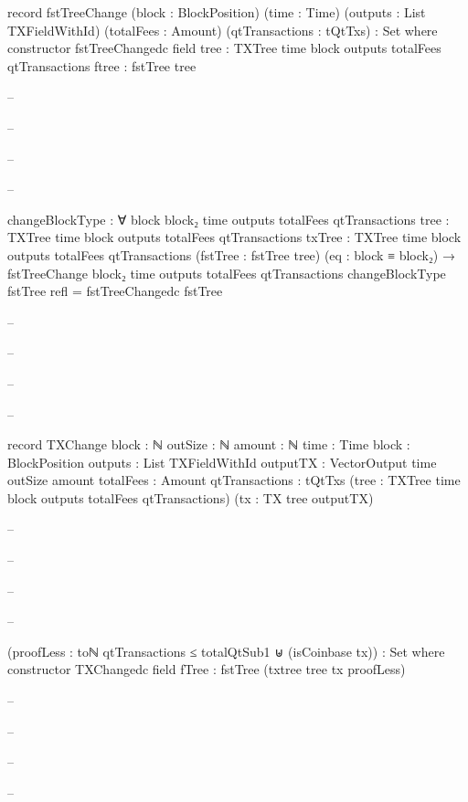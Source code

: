 \documentclass{beamer}
\begin{document}
{\begin{frame}
\begin{code}
      record fstTreeChange
        (block : BlockPosition)
        (time : Time)
        (outputs : List TXFieldWithId)
        (totalFees : Amount)
        (qtTransactions : tQtTxs)
        : Set where
        constructor fstTreeChangedc
        field
          {tree}      : TXTree time block outputs
            totalFees qtTransactions
          ftree       : fstTree tree

-- \end{code}
-- \end{frame}
-- \begin{frame}
-- \begin{code}

      changeBlockType : ∀
        {block block₂ time outputs totalFees qtTransactions}
        {tree : TXTree time block outputs totalFees qtTransactions}
        {txTree : TXTree time block outputs
          totalFees qtTransactions}
        (fstTree : fstTree tree)
        (eq : block ≡ block₂)
        → fstTreeChange block₂ time outputs
          totalFees qtTransactions
      changeBlockType fstTree refl = fstTreeChangedc fstTree

-- \end{code}
-- \end{frame}
-- \begin{frame}
-- \begin{code}

      record TXChange
        {block : ℕ}
        {outSize : ℕ}
        {amount : ℕ}
        {time : Time}
        {block : BlockPosition}
        {outputs : List TXFieldWithId}
        {outputTX : VectorOutput time outSize amount}
        {totalFees : Amount}
        {qtTransactions : tQtTxs}
        (tree : TXTree time block outputs totalFees qtTransactions)
        (tx : TX tree outputTX)

-- \end{code}
-- \end{frame}
-- \begin{frame}
-- \begin{code}

        (proofLess :
          toℕ qtTransactions ≤ totalQtSub1
          ⊎
          (isCoinbase tx))
        : Set where
        constructor TXChangedc
        field
          fTree                 : fstTree (txtree tree tx proofLess)

-- \end{code}
-- \end{frame}
-- \begin{frame}
-- \begin{code}



\end{code}
\end{frame}}
\end{document}
